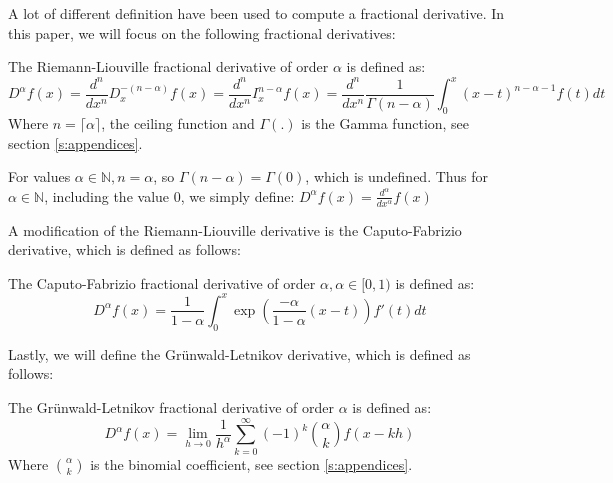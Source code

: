 A lot of different definition have been used to compute a fractional derivative. In this paper, we will focus on the following fractional derivatives:
\begin{definition}
    The Riemann-Liouville fractional derivative of order \(\alpha\) is defined as:
    \begin{equation}
        D^{\alpha} f(x) =  \frac{d^{n}}{dx^{n}} D_{x}^{-(n - \alpha)} f(x) = \frac{d^{n}}{dx^{n}} I_{x}^{n - \alpha} f(x) = \frac{d^n}{dx^n} \frac{1}{\Gamma(n -\alpha)}  \int_{0}^{x} (x-t)^{n - \alpha-1} f(t) dt
    \end{equation}
    Where \(n = \lceil \alpha \rceil\), the ceiling function and \(\Gamma(.)\) is the Gamma function, see section \ref{s:appendices}.
    
    \begin{remark}\label{r: integer}
        For values \(\alpha \in \mathbb{N}, n = \alpha\), so \(\Gamma(n - \alpha) = \Gamma(0)\), which is undefined. Thus for \(\alpha \in \mathbb{N}\), including the value \(0\), we simply define: \(D^\alpha f(x) = \frac{d^\alpha}{dx^\alpha} f(x)\)
    \end{remark}
   
\end{definition}
A modification of the Riemann-Liouville derivative is the Caputo-Fabrizio derivative, which is defined as follows:
\begin{definition}\label{d: CF}
    The Caputo-Fabrizio fractional derivative of order \(\alpha, \alpha \in [0,1)\) is defined as:
    \begin{equation}
        D^{\alpha} f(x) = \frac{1}{1 - \alpha}  \int_{0}^{x} \exp(\frac{-\alpha}{1 - \alpha}(x-t)) f'(t) dt
    \end{equation}
    
    
\end{definition}

Lastly, we will define the Grünwald-Letnikov derivative, which is defined as follows:
\begin{definition}
    The Grünwald-Letnikov fractional derivative of order \(\alpha\) is defined as:
    \begin{equation}
        D^\alpha f(x) = \lim_{h \to 0} \frac{1}{h^\alpha} \sum_{k=0}^\infty (-1)^k \binom{\alpha}{k} f(x - k h)
    \end{equation}
   Where \(\binom{\alpha}{k}\) is the binomial coefficient, see section \ref{s:appendices}.
\end{definition}

